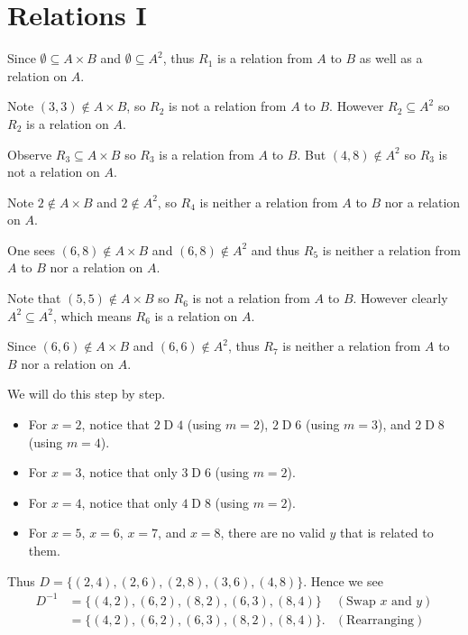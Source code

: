 \section{Relations I}
\begin{questions}
    \item \begin{partquestions}{\alph*}
        \item Since $\emptyset \subseteq A\times B$ and $\emptyset \subseteq A^2$, thus $R_1$ is a relation from $A$ to $B$ as well as a relation on $A$.
        \item Note $(3, 3) \notin A\times B$, so $R_2$ is not a relation from $A$ to $B$. However $R_2 \subseteq A^2$ so $R_2$ is a relation on $A$.
        \item Observe $R_3 \subseteq A\times B$ so $R_3$ is a relation from $A$ to $B$. But $(4, 8) \notin A^2$ so $R_3$ is not a relation on $A$.
        \item Note $2 \notin A \times B$ and $2 \notin A^2$, so $R_4$ is neither a relation from $A$ to $B$ nor a relation on $A$.
        \item One sees $(6, 8) \notin A\times B$ and $(6, 8) \notin A^2$ and thus $R_5$ is neither a relation from $A$ to $B$ nor a relation on $A$.
        \item Note that $(5, 5) \notin A \times B$ so $R_6$ is not a relation from $A$ to $B$. However clearly $A^2 \subseteq A^2$, which means $R_6$ is a relation on $A$.
        \item Since $(6, 6) \notin A \times B$ and $(6, 6) \notin A^2$, thus $R_7$ is neither a relation from $A$ to $B$ nor a relation on $A$.
    \end{partquestions}

    \item \begin{partquestions}{\roman*}
        \item We will do this step by step.
        \begin{itemize}
            \item For $x = 2$, notice that $2 \mathrel{D} 4$ (using $m = 2$), $2 \mathrel{D} 6$ (using $m = 3$), and $2 \mathrel{D} 8$ (using $m = 4$).
            \item For $x = 3$, notice that only $3 \mathrel{D} 6$ (using $m = 2$).
            \item For $x = 4$, notice that only $4 \mathrel{D} 8$ (using $m = 2$).
            \item For $x = 5$, $x = 6$, $x = 7$, and $x = 8$, there are no valid $y$ that is related to them.
        \end{itemize}
        Thus $D = \{(2, 4), (2, 6), (2, 8), (3, 6), (4, 8)\}$. Hence we see
        \begin{align*}
            D^{-1} &= \{(4, 2), (6, 2), (8, 2), (6, 3), (8, 4)\} & (\text{Swap } x \text{ and } y)\\
            &= \{(4, 2), (6, 2), (6, 3), (8, 2), (8, 4)\}. & (\text{Rearranging})
        \end{align*}
        

\end{partquestions}
\end{questions}
